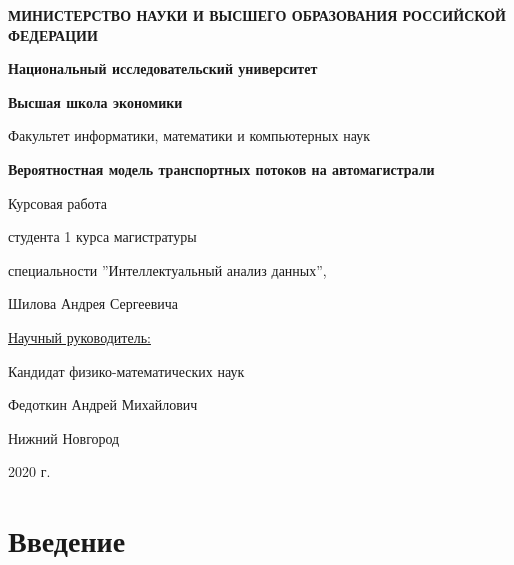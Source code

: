 \documentclass[a4paper, 14pt, russian]{article}
\begin{document}
\begin{titlepage}
\begin{center}
\textbf{МИНИСТЕРСТВО НАУКИ И ВЫСШЕГО ОБРАЗОВАНИЯ РОССИЙСКОЙ ФЕДЕРАЦИИ}

\vspace{0.3cm}

\textbf{Национальный исследовательский университет}

\textbf{Высшая школа экономики}

\vspace{0.3cm}

Факультет информатики, математики и компьютерных наук
\end{center}


\begin{center}
\Large{\bf{Вероятностная модель транспортных потоков на автомагистрали}}
\end{center}

\vspace{0.3cm}

\begin{flushright}
Курсовая работа

студента 1 курса магистратуры

специальности ''Интеллектуальный анализ данных'',

Шилова Андрея Сергеевича

\vspace{0.5 cm}
\underline{Научный руководитель:}

Кандидат физико-математических наук

Федоткин Андрей Михайлович

\end{flushright}

\vspace{9cm}

\begin{center}
Нижний Новгород

2020 г.
\end{center}

\end{titlepage}

\tableofcontents                %

\newpage

\section{Введение}
\end{document}
